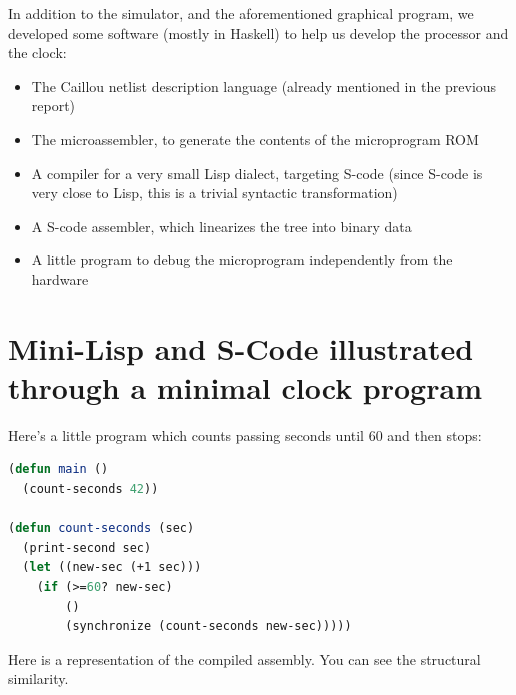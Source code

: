 \documentclass[a4paper, 11pt]{article}
\begin{document}
In addition to the simulator, and the aforementioned graphical program, we developed some software (mostly in Haskell) to help us develop the processor and the clock:
\begin{itemize}
\item The Caillou netlist description language (already mentioned in the previous report)
\item The microassembler, to generate the contents of the microprogram ROM
\item A compiler for a very small Lisp dialect, targeting S-code (since S-code is very close to Lisp, this is a trivial syntactic transformation)
\item A S-code assembler, which linearizes the tree into binary data
\item A little program to debug the microprogram independently from the hardware
\end{itemize}


\appendix


\section{Mini-Lisp and S-Code illustrated through a minimal clock program}

Here's a little program which counts passing seconds until 60 and then stops:

\begin{lstlisting}[language=Lisp]
(defun main ()
  (count-seconds 42))

(defun count-seconds (sec)
  (print-second sec)
  (let ((new-sec (+1 sec)))
    (if (>=60? new-sec)
        ()  
        (synchronize (count-seconds new-sec)))))
\end{lstlisting}

Here is a representation of the compiled assembly. You can see the structural similarity.
\end{document}
